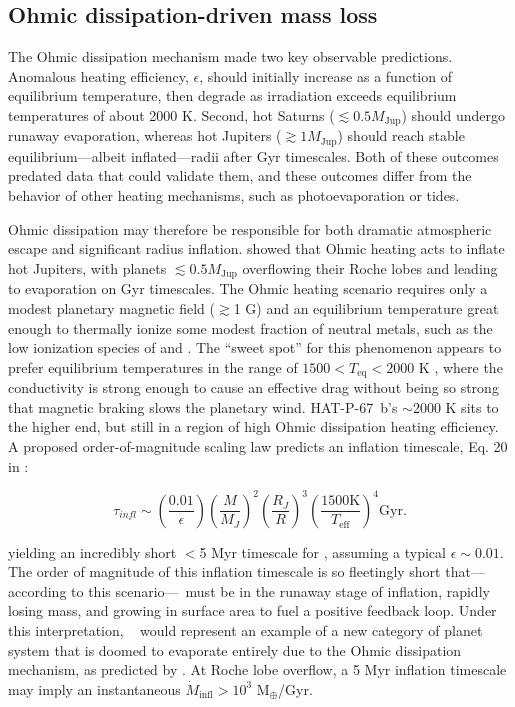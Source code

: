 \documentclass[twocolumn]{aastex631}
\newcommand{\hatpb}{\object{HAT-P-67 b}}
\begin{document}
\subsection{Ohmic dissipation-driven mass loss}
The Ohmic dissipation mechanism made two key observable predictions.  Anomalous heating efficiency, $\epsilon$, should initially increase as a function of equilibrium temperature, then degrade as irradiation exceeds equilibrium temperatures of about 2000 K.  Second, hot Saturns ($\lesssim0.5 M_\mathrm{Jup}$) should undergo runaway evaporation, whereas hot Jupiters ($\gtrsim 1 M_\mathrm{Jup}$) should reach stable equilibrium---albeit inflated---radii after Gyr timescales.  Both of these outcomes predated data that could validate them, and these outcomes differ from the behavior of other heating mechanisms, such as photoevaporation or tides.  

Ohmic dissipation may therefore be responsible for both dramatic atmospheric escape and significant radius inflation.  \citet{2011ApJ...738....1B} showed that Ohmic heating acts to inflate hot Jupiters, with planets $\lesssim 0.5 M_\mathrm{Jup}$ overflowing their Roche lobes and leading to evaporation on Gyr timescales.  The Ohmic heating scenario requires only a modest planetary magnetic field ($\gtrsim$1 G) and an equilibrium temperature great enough to thermally ionize some modest fraction of neutral metals, such as the low ionization species of  and .  The ``sweet spot'' for this phenomenon appears to prefer equilibrium temperatures in the range of $1500<T_\mathrm{eq}<2000$ K \citep{2011ApJ...738....1B,2012ApJ...745..138M,2016ApJ...819..116G,2018AJ....155..214T,2022A&A...658L...7K}, where the conductivity is strong enough to cause an effective drag without being so strong that magnetic braking slows the planetary wind.  HAT-P-67~b's $\sim$2000 K sits to the higher end, but still in a region of high Ohmic dissipation heating efficiency.  A proposed order-of-magnitude scaling law predicts an inflation timescale, Eq. 20 in \citet{2011ApJ...738....1B}:

\begin{equation}
    \tau_{\textit{infl}}\sim \left(\frac{0.01}{\epsilon} \right) \left(\frac{M}{M_{J}}\right)^2 \left(\frac{R_{J}}{R}\right)^3 \left(\frac{1500 \textrm{K}}{T_\mathrm{eff}}\right)^4 \textrm{Gyr}. \label{eqInflate}
\end{equation}


\noindent yielding an incredibly short $<$5 Myr timescale for \hatpb, assuming a typical $\epsilon\sim0.01$.  The order of magnitude of this inflation timescale is so fleetingly short that---according to this scenario---\hatpb~must be in the runaway stage of inflation, rapidly losing mass, and growing in surface area to fuel a positive feedback loop.  Under this interpretation, \hatpb~ would represent an example of a new category of planet system that is doomed to evaporate entirely due to the Ohmic dissipation mechanism, as predicted by \citet{2011ApJ...738....1B}.  At Roche lobe overflow, a 5 Myr inflation timescale may imply an instantaneous $\dot{M}_\mathrm{infl}>10^{3}$ M$_\oplus$/Gyr.
\end{document}
